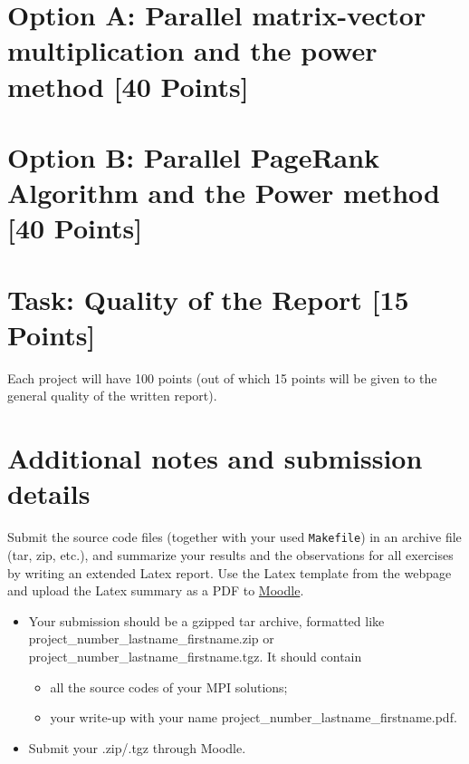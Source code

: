 \documentclass[unicode,11pt,a4paper,oneside,numbers=endperiod,openany]{scrartcl}
\begin{document}
\section{Option A: Parallel matrix-vector multiplication and the power method [40 Points]}





\section{Option B: Parallel PageRank Algorithm and the Power method  [40 Points]}



\section{Task:  Quality of the Report [15 Points]}
Each project will have 100 points (out of  which 15 points will be given to
the general quality of the written report).



\section*{Additional notes and submission details}
Submit the source code files (together with your used \texttt{Makefile}) in
an archive file (tar, zip, etc.), and summarize your results and the
observations for all exercises by writing an extended Latex report.
Use the Latex template from the webpage and upload the Latex summary
as a PDF to \href{https://moodle-app2.let.ethz.ch/course/view.php?id=14316}{Moodle}.

\begin{itemize}
	\item Your submission should be a gzipped tar archive, formatted like project\_number\_lastname\_firstname.zip or project\_number\_lastname\_firstname.tgz. 
	It should contain
	\begin{itemize}
		\item all the source codes of your MPI solutions;
		\item your write-up with your name  project\_number\_lastname\_firstname.pdf.
	\end{itemize}
	\item Submit your .zip/.tgz through Moodle.
\end{itemize}
\end{document}
